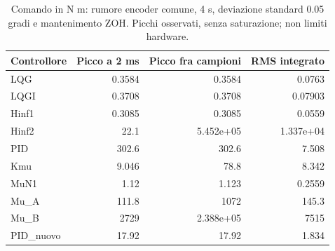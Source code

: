 \par
\begin{table}[htbp]\centering\small
\setlength{\tabcolsep}{4pt}
\begin{tabular}{lrrr}\toprule
Controllore & Picco a 2 ms & Picco fra campioni & RMS integrato\\\midrule
LQG & 0.3584 & 0.3584 & 0.0763\\
LQGI & 0.3708 & 0.3708 & 0.07903\\
Hinf1 & 0.3085 & 0.3085 & 0.0559\\
Hinf2 & 22.1 & 5.452e+05 & 1.337e+04\\
PID & 302.6 & 302.6 & 7.508\\
Kmu & 9.046 & 78.8 & 8.342\\
MuN1 & 1.12 & 1.123 & 0.2559\\
Mu\_A & 111.8 & 1072 & 145.3\\
Mu\_B & 2729 & 2.388e+05 & 7515\\
PID\_nuovo & 17.92 & 17.92 & 1.834\\
\bottomrule\end{tabular}
\caption{Comando in N m: rumore encoder comune, 4 s, deviazione standard 0.05 gradi e mantenimento ZOH. Picchi osservati, senza saturazione; non limiti hardware.}
\end{table}
\par
